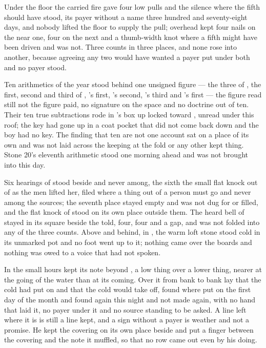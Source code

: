 Under the floor the carried fire gave four low pulls and the silence where the fifth should have stood, its payer without a name three hundred and seventy-eight days, and nobody lifted the floor to supply the pull; overhead  kept four nails on the near one, four on the next and a thumb-width knot where a fifth might have been driven and was not. Three counts in three places, and none rose into another, because agreeing any two would have wanted a payer put under both and no payer stood.

Ten arithmetics of the year stood behind one unsigned figure — the three of , the first, second and third of , 's first, 's second, 's third and 's first — the figure read still not the figure paid, no signature on the space and no doctrine out of ten. Their ten true subtractions rode in 's box up  locked toward , unread under this roof; the key had gone up in a coat pocket that did not come back down and the boy had no key. The finding that ten are not one account sat on a place of its own and was not laid across the keeping at the fold or any other kept thing. Stone 20's eleventh arithmetic stood one morning ahead and was not brought into this day.

Six hearings of  stood beside and never among, the sixth the small flat knock out of  as the men lifted her, filed where a thing out of a person must go and never among the sources; the seventh place stayed empty and was not dug for or filled, and the flat knock of  stood on its own place outside them. The heard bell of  stayed in its square beside the told, four, four and a gap, and was not folded into any of the three counts. Above and behind, in , the warm loft stone stood cold in its unmarked pot and no foot went up to it; nothing came over the boards and nothing was owed to a voice that had not spoken.

\scenebreak

In the small hours  kept its note beyond , a low thing over a lower thing, nearer at the going of the water than at its coming. Over it from bank to bank lay  that the cold had put on and that the cold would take off, found where put on the first day of the month and found again this night and not made again, with no hand that laid it, no payer under it and no source standing to be asked. A line left where it is is still a line kept, and a sign without a payer is weather and not a promise. He kept the covering on its own place beside  and put a finger between the covering and the note it muffled, so that no row came out even by his doing.

